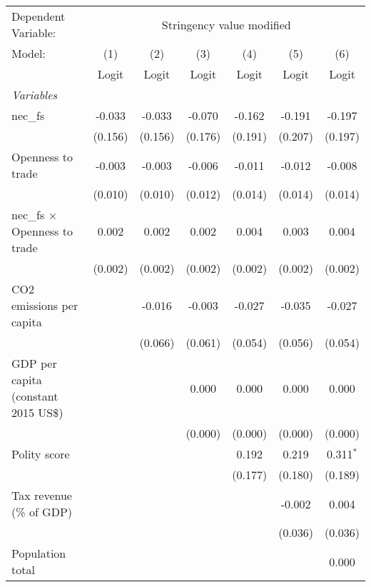 
\begingroup
\centering
\begin{tabular}{lcccccc}
   \toprule
   Dependent Variable: & \multicolumn{6}{c}{Stringency value modified}\\
   Model:                               & (1)     & (2)     & (3)     & (4)     & (5)     & (6)\\  
                                        &  Logit  & Logit   & Logit   & Logit   & Logit   & Logit\\  
   \midrule
   \emph{Variables}\\
   nec\_fs                              & -0.033  & -0.033  & -0.070  & -0.162  & -0.191  & -0.197\\   
                                        & (0.156) & (0.156) & (0.176) & (0.191) & (0.207) & (0.197)\\   
   Openness to trade                    & -0.003  & -0.003  & -0.006  & -0.011  & -0.012  & -0.008\\   
                                        & (0.010) & (0.010) & (0.012) & (0.014) & (0.014) & (0.014)\\   
   nec\_fs $\times$ Openness to trade   & 0.002   & 0.002   & 0.002   & 0.004   & 0.003   & 0.004\\   
                                        & (0.002) & (0.002) & (0.002) & (0.002) & (0.002) & (0.002)\\   
   CO2 emissions per capita             &         & -0.016  & -0.003  & -0.027  & -0.035  & -0.027\\   
                                        &         & (0.066) & (0.061) & (0.054) & (0.056) & (0.054)\\   
   GDP per capita (constant 2015 US\$)  &         &         & 0.000   & 0.000   & 0.000   & 0.000\\   
                                        &         &         & (0.000) & (0.000) & (0.000) & (0.000)\\   
   Polity score                         &         &         &         & 0.192   & 0.219   & 0.311$^{*}$\\   
                                        &         &         &         & (0.177) & (0.180) & (0.189)\\   
   Tax revenue (\% of GDP)              &         &         &         &         & -0.002  & 0.004\\   
                                        &         &         &         &         & (0.036) & (0.036)\\   
   Population total                     &         &         &         &         &         & 0.000\\   

\end{tabular}
